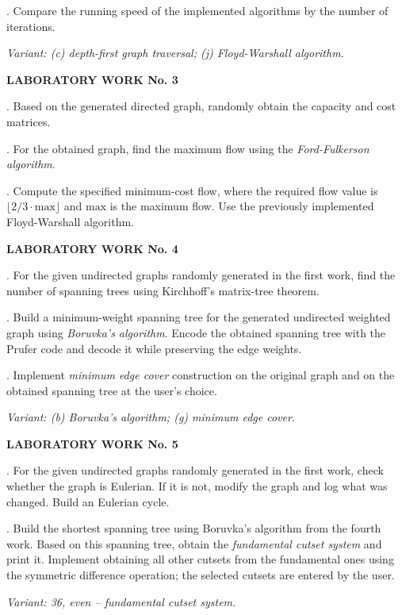 \documentclass[a4paper,final]{article}
\begin{document}
.\; Compare the running speed of the implemented algorithms by the number of iterations.

\noindent\textit{Variant: (c) depth-first graph traversal; (j) Floyd-Warshall algorithm.}

\medskip
\noindent\textbf{LABORATORY WORK No. 3}

.\; Based on the generated directed graph, randomly obtain the capacity and cost matrices.

.\; For the obtained graph, find the maximum flow using the \textit{Ford-Fulkerson algorithm}.

.\; Compute the specified minimum-cost flow, where the required flow value is $\lfloor 2/3 \cdot \mathrm{max} \rfloor$ and $\mathrm{max}$ is the maximum flow. Use the previously implemented Floyd-Warshall algorithm.

\medskip
\noindent\textbf{LABORATORY WORK No. 4}

.\; For the given undirected graphs randomly generated in the first work, find the number of spanning trees using Kirchhoff's matrix-tree theorem.

.\; Build a minimum-weight spanning tree for the generated undirected weighted graph using \textit{Boruvka's algorithm}. Encode the obtained spanning tree with the Prufer code and decode it while preserving the edge weights.

.\; Implement \textit{minimum edge cover} construction on the original graph and on the obtained spanning tree at the user's choice.

\noindent\textit{Variant: (b) Boruvka's algorithm; (g) minimum edge cover.}

\medskip
\noindent\textbf{LABORATORY WORK No. 5}

.\; For the given undirected graphs randomly generated in the first work, check whether the graph is Eulerian. If it is not, modify the graph and log what was changed. Build an Eulerian cycle.

.\; Build the shortest spanning tree using Boruvka's algorithm from the fourth work. Based on this spanning tree, obtain the \textit{fundamental cutset system} and print it. Implement obtaining all other cutsets from the fundamental ones using the symmetric difference operation; the selected cutsets are entered by the user.

\noindent\textit{Variant: 36, even -- fundamental cutset system.}
\end{document}
